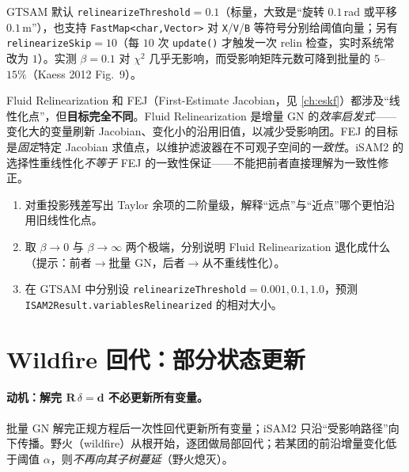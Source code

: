\noindent GTSAM 默认 \texttt{relinearizeThreshold}$=0.1$（标量，大致是“旋转 $0.1$\,rad 或平移 $0.1$\,m”），也支持 \texttt{FastMap<char,Vector>} 对 \texttt{X}/\texttt{V}/\texttt{B} 等符号分别给阈值向量；另有 \texttt{relinearizeSkip}$=10$（每 $10$ 次 \texttt{update()} 才触发一次 relin 检查，实时系统常改为 $1$）。实测 $\beta=0.1$ 对 $\chi^2$ 几乎无影响，而受影响矩阵元数可降到批量的 $5$--$15\%$（Kaess 2012 Fig.~9\cite{kaess2012isam2}）。

\begin{pitfall}
Fluid Relinearization 和 FEJ（First-Estimate Jacobian，见 \cref{ch:eskf}）都涉及“线性化点”，但\textbf{目标完全不同}。Fluid Relinearization 是增量 GN 的\emph{效率启发式}——变化大的变量刷新 Jacobian、变化小的沿用旧值，以减少受影响团。FEJ 的目标是\emph{固定}特定 Jacobian 求值点，以维护滤波器在不可观子空间的\emph{一致性}。iSAM2 的选择性重线性化\emph{不等于} FEJ 的一致性保证——不能把前者直接理解为一致性修正。
\end{pitfall}

\begin{practice}
\begin{enumerate}
  \item 对重投影残差写出 Taylor 余项的二阶量级，解释“远点”与“近点”哪个更怕沿用旧线性化点。
  \item 取 $\beta\to 0$ 与 $\beta\to\infty$ 两个极端，分别说明 Fluid Relinearization 退化成什么（提示：前者$\to$批量 GN，后者$\to$从不重线性化）。
  \item 在 GTSAM 中分别设 \texttt{relinearizeThreshold}$=0.001,0.1,1.0$，预测 \texttt{ISAM2Result.variablesRelinearized} 的相对大小。
\end{enumerate}
\end{practice}

\section{Wildfire 回代：部分状态更新}
\label{sec:isam-wildfire}

\paragraph{动机：解完 $\mathbf{R}\,\delta=\mathbf{d}$ 不必更新所有变量。}
批量 GN 解完正规方程后一次性回代更新所有变量；iSAM2 只沿“受影响路径”向下传播。野火（wildfire）从根开始，逐团做局部回代；若某团的前沿增量变化低于阈值 $\alpha$，则\emph{不再向其子树蔓延}（野火熄灭）。

